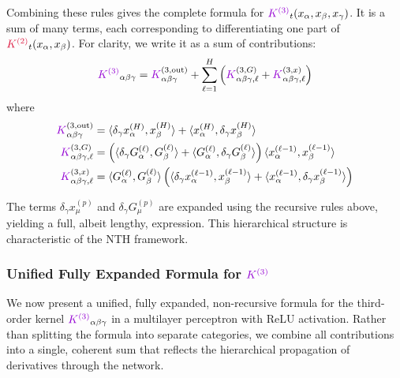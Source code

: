 \documentclass[a4paper]{article}
\theoremstyle{plain}
\theoremstyle{definition}
\theoremstyle{remark}
\begin{document}
Combining these rules gives the complete formula for $\textcolor{k3color}{K^{(3)}}_t(x_\alpha, x_\beta, x_\gamma)$. It is a sum of many terms, each corresponding to differentiating one part of $\textcolor{kernelcolor}{\textcolor{kernelcolor}{K}^{(2)}}_t(x_\alpha, x_\beta)$. For clarity, we write it as a sum of contributions:
\begin{equation}
\textcolor{k3color}{K^{(3)}}_{\alpha\beta\gamma} = \textcolor{k3color}{K}^{(3, \text{out})}_{\alpha\beta\gamma} + \sum_{\ell=1}^H \left( \textcolor{k3color}{K}^{(3, G)}_{\alpha\beta\gamma, \ell} + \textcolor{k3color}{K}^{(3, x)}_{\alpha\beta\gamma, \ell} \right)
\end{equation}
where
\begin{align}
\textcolor{k3color}{K}^{(3, \text{out})}_{\alpha\beta\gamma} &= \langle \delta_\gamma x^{(H)}_\alpha, x^{(H)}_\beta \rangle + \langle x^{(H)}_\alpha, \delta_\gamma x^{(H)}_\beta \rangle \\
\textcolor{k3color}{K}^{(3, G)}_{\alpha\beta\gamma, \ell} &= \left( \langle \delta_\gamma G^{(\ell)}_\alpha, G^{(\ell)}_\beta \rangle + \langle G^{(\ell)}_\alpha, \delta_\gamma G^{(\ell)}_\beta \rangle \right) \langle x^{(\ell-1)}_\alpha, x^{(\ell-1)}_\beta \rangle \\
\textcolor{k3color}{K}^{(3, x)}_{\alpha\beta\gamma, \ell} &= \langle G^{(\ell)}_\alpha, G^{(\ell)}_\beta \rangle \left( \langle \delta_\gamma x^{(\ell-1)}_\alpha, x^{(\ell-1)}_\beta \rangle + \langle x^{(\ell-1)}_\alpha, \delta_\gamma x^{(\ell-1)}_\beta \rangle \right)
\end{align}

The terms $\delta_\gamma x^{(p)}_\mu$ and $\delta_\gamma G^{(p)}_\mu$ are expanded using the recursive rules above, yielding a full, albeit lengthy, expression. This hierarchical structure is characteristic of the NTH framework.




\subsubsection{Unified Fully Expanded Formula for $\textcolor{k3color}{K^{(3)}}$}

We now present a unified, fully expanded, non-recursive formula for the third-order kernel $\textcolor{k3color}{K^{(3)}}_{\alpha\beta\gamma}$ in a multilayer perceptron with ReLU activation. Rather than splitting the formula into separate categories, we combine all contributions into a single, coherent sum that reflects the hierarchical propagation of derivatives through the network.
\end{document}
